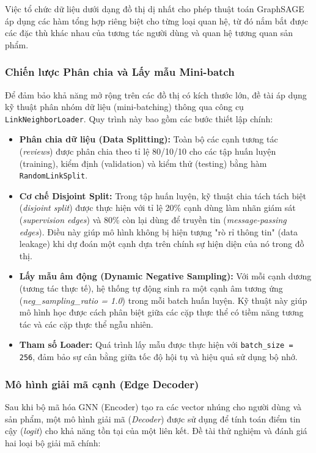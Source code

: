 Việc tổ chức dữ liệu dưới dạng đồ thị dị nhất cho phép thuật toán GraphSAGE áp dụng các hàm tổng hợp riêng biệt cho từng loại quan hệ, từ đó nắm bắt được các đặc thù khác nhau của tương tác người dùng và quan hệ tương quan sản phẩm.

\subsubsection{Chiến lược Phân chia và Lấy mẫu Mini-batch}

Để đảm bảo khả năng mở rộng trên các đồ thị có kích thước lớn, đề tài áp dụng kỹ thuật phân nhóm dữ liệu (mini-batching) thông qua công cụ \texttt{LinkNeighborLoader}. Quy trình này bao gồm các bước thiết lập chính:

\begin{itemize}
    \item \textbf{Phân chia dữ liệu (Data Splitting):} Toàn bộ các cạnh tương tác (\textit{reviews}) được phân chia theo tỉ lệ 80/10/10 cho các tập huấn luyện (training), kiểm định (validation) và kiểm thử (testing) bằng hàm \texttt{RandomLinkSplit}. 
    \item \textbf{Cơ chế Disjoint Split:} Trong tập huấn luyện, kỹ thuật chia tách tách biệt (\textit{disjoint split}) được thực hiện với tỉ lệ 20\% cạnh dùng làm nhãn giám sát (\textit{supervision edges}) và 80\% còn lại dùng để truyền tin (\textit{message-passing edges}). Điều này giúp mô hình không bị hiện tượng "rò rỉ thông tin" (data leakage) khi dự đoán một cạnh dựa trên chính sự hiện diện của nó trong đồ thị.
    \item \textbf{Lấy mẫu âm động (Dynamic Negative Sampling):} Với mỗi cạnh dương (tương tác thực tế), hệ thống tự động sinh ra một cạnh âm tương ứng (\textit{neg\_sampling\_ratio = 1.0}) trong mỗi batch huấn luyện. Kỹ thuật này giúp mô hình học được cách phân biệt giữa các cặp thực thể có tiềm năng tương tác và các cặp thực thể ngẫu nhiên.
    \item \textbf{Tham số Loader:} Quá trình lấy mẫu được thực hiện với \texttt{batch\_size = 256}, đảm bảo sự cân bằng giữa tốc độ hội tụ và hiệu quả sử dụng bộ nhớ.
\end{itemize}

\subsubsection{Mô hình giải mã cạnh (Edge Decoder)}

Sau khi bộ mã hóa GNN (Encoder) tạo ra các vector nhúng cho người dùng và sản phẩm, một mô hình giải mã (\textit{Decoder}) được sử dụng để tính toán điểm tin cậy (\textit{logit}) cho khả năng tồn tại của một liên kết. Đề tài thử nghiệm và đánh giá hai loại bộ giải mã chính:

